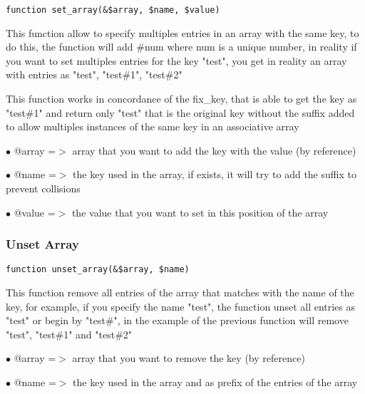 \documentclass[a4paper]{article}
\begin{document}
\begin{lstlisting}
function set_array(&$array, $name, $value)
\end{lstlisting}

This function allow to specify multiples entries in an array with the same key,
to do this, the function will add \#num where num is a unique number, in reality
if you want to set multiples entries for the key "test", you get in reality an
array with entries as "test", "test\#1", "test\#2"

This function works in concordance of the fix\_key, that is able to get the key
as "test\#1" and return only "test" that is the original key without the suffix
added to allow multiples instances of the same key in an associative array

\begin{compactitem}
\item[\color{myblue}$\bullet$] @array =$>$ array that you want to add the key with the value (by reference)
\item[\color{myblue}$\bullet$] @name  =$>$ the key used in the array, if exists, it will try to add the suffix to
          prevent collisions
\item[\color{myblue}$\bullet$] @value =$>$ the value that you want to set in this position of the array
\end{compactitem}

\hypertarget{toc275}{}
\subsubsection{Unset Array}

\begin{lstlisting}
function unset_array(&$array, $name)
\end{lstlisting}

This function remove all entries of the array that matches with the name of
the key, for example, if you specify the name "test", the function unset all
entries as "test" or begin by "test\#", in the example of the previous function
will remove "test", "test\#1" and "test\#2"

\begin{compactitem}
\item[\color{myblue}$\bullet$] @array =$>$ array that you want to remove the key (by reference)
\item[\color{myblue}$\bullet$] @name  =$>$ the key used in the array and as prefix of the entries of the array
\end{compactitem}
\end{document}
